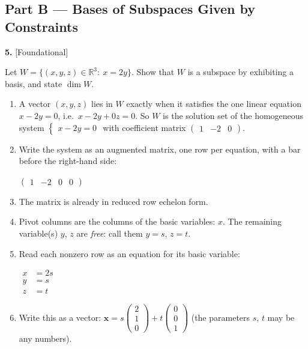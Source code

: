 \documentclass[11pt]{article}
\begin{document}
\par\vspace{2pt}
\subsection*{\normalsize\color{ink} Part B --- Bases of Subspaces Given by Constraints}
\begin{minipage}{\linewidth}\textbf{5.} \hfill{\scriptsize\color{ink}[Foundational]}\par\nopagebreak Let $W=\{(x,y,z)\in\mathbb{R}^{3}:\ x=2y\}$. Show that $W$ is a subspace by exhibiting a basis, and state $\dim W$.
\end{minipage}\par\nopagebreak
\begin{tcolorbox}[breakable,colback=ans,colframe=ansb,boxrule=0.5pt,left=4pt,right=4pt,top=2pt,bottom=2pt]\begin{enumerate}[leftmargin=3.1em,itemsep=1pt,topsep=1pt,label=\textbf{Step \arabic*.}]\item A vector $(x,y,z)$ lies in $W$ exactly when it satisfies the one linear equation $x-2y=0$, i.e.\ $x-2y+0z=0$. So $W$ is the solution set of the homogeneous system $\begin{cases}x-2y=0\end{cases}$ with coefficient matrix $\begin{pmatrix}1&-2&0\end{pmatrix}$.
\item Write the system as an augmented matrix, one row per equation, with a bar before the right-hand side:\par\smallskip $\displaystyle \left(\begin{array}{ccc|c}1 & -2 & 0 & 0\end{array}\right)$
\item The matrix is already in reduced row echelon form.
\item Pivot columns are the columns of the basic variables: $x$. The remaining variable(s) $y$, $z$ are \emph{free}: call them $y=s$, $z=t$.
\item Read each nonzero row as an equation for its basic variable:\par\smallskip $\displaystyle\begin{aligned}x&=2s\\ y&=s\\ z&=t\end{aligned}$
\item Write this as a vector: $\displaystyle \mathbf x=s\begin{pmatrix}2\\1\\0\end{pmatrix}+t\begin{pmatrix}0\\0\\1\end{pmatrix}$ (the parameters $s$, $t$ may be any numbers).

\end{enumerate}
\end{tcolorbox}
\end{document}
